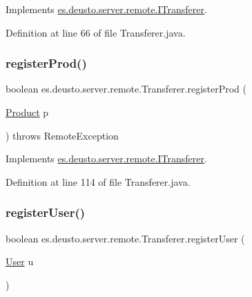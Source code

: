 Implements \hyperlink{interfacees_1_1deusto_1_1server_1_1remote_1_1_i_transferer_ab767521556fc61bc5a39306080f00cae}{es.\+deusto.\+server.\+remote.\+I\+Transferer}.



Definition at line 66 of file Transferer.\+java.

\mbox{\label{classes_1_1deusto_1_1server_1_1remote_1_1_transferer_a64c1f3b57b74106df83335b124937afe}} 
\subsubsection{\texorpdfstring{register\+Prod()}{registerProd()}}
{\footnotesize\ttfamily boolean es.\+deusto.\+server.\+remote.\+Transferer.\+register\+Prod (\begin{DoxyParamCaption}\item[{\hyperlink{classes_1_1deusto_1_1server_1_1db_1_1data_1_1_product}{Product}}]{p }\end{DoxyParamCaption}) throws Remote\+Exception}



Implements \hyperlink{interfacees_1_1deusto_1_1server_1_1remote_1_1_i_transferer_a06629c7021aae4d2ce1a449726102ded}{es.\+deusto.\+server.\+remote.\+I\+Transferer}.



Definition at line 114 of file Transferer.\+java.

\mbox{\label{classes_1_1deusto_1_1server_1_1remote_1_1_transferer_a80e2dd7db595bdd8d39969e5d0e8ae7b}} 
\subsubsection{\texorpdfstring{register\+User()}{registerUser()}}
{\footnotesize\ttfamily boolean es.\+deusto.\+server.\+remote.\+Transferer.\+register\+User (\begin{DoxyParamCaption}\item[{\hyperlink{classes_1_1deusto_1_1server_1_1db_1_1data_1_1_user}{User}}]{u }\end{DoxyParamCaption})}



